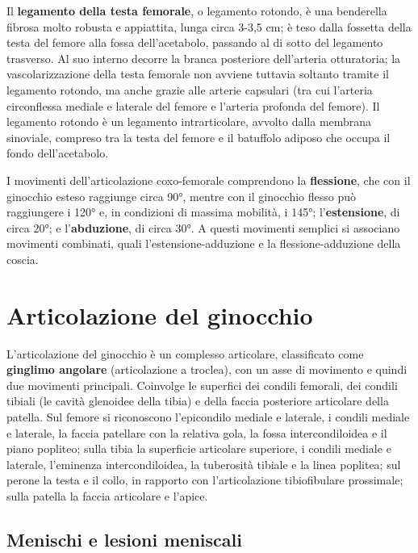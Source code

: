 Il \textbf{legamento della testa femorale}, o legamento rotondo, è una
benderella fibrosa molto robusta e appiattita, lunga circa 3-3,5 cm; è
teso dalla fossetta della testa del femore alla fossa dell'acetabolo,
passando al di sotto del legamento trasverso. Al suo interno decorre la
branca posteriore dell'arteria otturatoria; la vascolarizzazione della
testa femorale non avviene tuttavia soltanto tramite il legamento
rotondo, ma anche grazie alle arterie capsulari (tra cui l'arteria
circonflessa mediale e laterale del femore e l'arteria profonda del
femore). Il legamento rotondo è un legamento intrarticolare, avvolto dalla
membrana sinoviale, compreso tra la testa del femore e il batuffolo
adiposo che occupa il fondo dell'acetabolo.

I movimenti dell'articolazione coxo-femorale comprendono la
\textbf{flessione}, che con il ginocchio esteso raggiunge circa 90°, mentre
con il ginocchio flesso può raggiungere i 120° e, in condizioni di massima
mobilità, i 145°; l'\textbf{estensione}, di circa 20°; e
l'\textbf{abduzione}, di circa 30°. A questi movimenti semplici si
associano movimenti combinati, quali l'estensione-adduzione e la
flessione-adduzione della coscia.

\section{Articolazione del ginocchio}

L'articolazione del ginocchio è un complesso articolare, classificato come
\textbf{ginglimo angolare} (articolazione a troclea), con un asse di
movimento e quindi due movimenti principali. Coinvolge le superfici dei
condili femorali, dei condili tibiali (le cavità glenoidee della tibia) e
della faccia posteriore articolare della patella. Sul femore si
riconoscono l'epicondilo mediale e laterale, i condili mediale e
laterale, la faccia patellare con la relativa gola, la fossa
intercondiloidea e il piano popliteo; sulla tibia la superficie articolare
superiore, i condili mediale e laterale, l'eminenza intercondiloidea, la
tuberosità tibiale e la linea poplitea; sul perone la testa e il collo,
in rapporto con l'articolazione tibiofibulare prossimale; sulla patella la
faccia articolare e l'apice.

\subsection{Menischi e lesioni meniscali}


